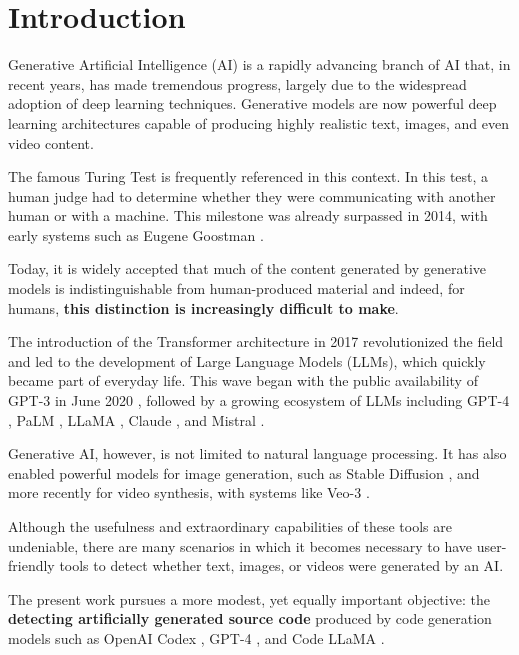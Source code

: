 \clearpage
\chapter{Introduction}


Generative Artificial Intelligence (AI) is a rapidly advancing 
branch of AI that, in recent years, has made 
tremendous progress, largely due to the widespread adoption of 
deep learning techniques. Generative models 
are now powerful deep learning architectures capable of producing 
highly realistic text, images, and even video content.


The famous Turing Test is frequently referenced in this context. 
In this test, a human judge had to determine whether they were 
communicating with another human or with a machine. This milestone 
was already surpassed in 2014, with early systems such as Eugene Goostman 
\cite{warwick2016turing}.


Today, it is widely accepted that much of the content generated by 
generative models is indistinguishable from human-produced material
and indeed, for humans, \textbf{this distinction is increasingly difficult 
to make}.


The introduction of the Transformer architecture in 2017 
\cite{vaswani2017attention} revolutionized the field 
and led to the development of Large Language Models (LLMs), 
which quickly became part of everyday life. This wave began 
with the public availability of GPT-3 \cite{brown2020language} in June 2020 
\cite{brown2020language}, followed by a growing ecosystem of 
LLMs including GPT-4 \cite{openai2023gpt4}, PaLM 
\cite{chowdhery2022palm}, LLaMA \cite{touvron2023llama}, 
Claude \cite{anthropic2023claude}, and Mistral \cite{jiang2023mistral}.

Generative AI, however, is not limited to natural language 
processing. It has also enabled powerful models for image 
generation, such as Stable Diffusion \cite{rombach2022high}, 
and more recently for video 
synthesis, with systems like Veo-3 \cite{google2024veo}.


Although the usefulness and extraordinary capabilities of these 
tools are undeniable, there are many scenarios in which it becomes 
necessary to have user-friendly tools to detect whether text, images, 
or videos were generated by an AI.

The present work pursues a more modest, yet equally important objective: the
\textbf{detecting artificially generated source code} produced by code generation 
models such as OpenAI Codex \cite{chen2021codex}, GPT-4 \cite{openai2023gpt4}, 
and Code LLaMA \cite{roziere2023code}.


